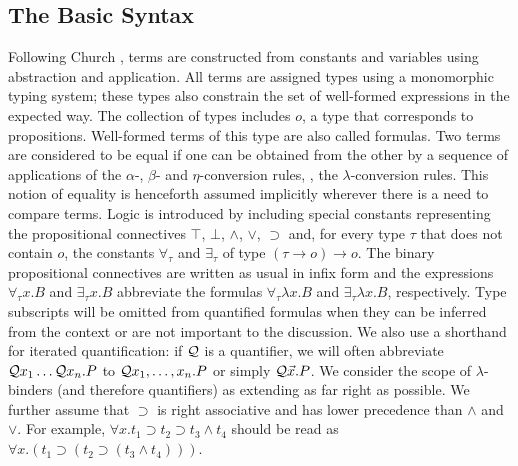 \subsection{The Basic Syntax}

Following Church \cite{church40}, terms are constructed from constants
and variables using abstraction and application. All terms are
assigned types using a monomorphic typing system; these types also
constrain the set of well-formed expressions in the expected way. The
collection of types includes $o$, a type that corresponds to
propositions. Well-formed terms of this type are also called formulas.
Two terms are considered to be equal if one can be obtained from the
other by a sequence of applications of the $\alpha$-, $\beta$- and
$\eta$-conversion rules, \ie, the $\lambda$-conversion rules. This
notion of equality is henceforth assumed implicitly wherever there is
a need to compare terms. Logic is introduced by including special
constants representing the propositional connectives $\top$, $\bot$,
$\land$, $\lor$, $\supset$ and, for every type $\tau$ that does not
contain $o$, the constants $\forall_\tau$ and $\exists_\tau$ of type
$(\tau \rightarrow o) \rightarrow o$. The binary propositional
connectives are written as usual in infix form and the expressions
$\forall_\tau x. B$ and $\exists_\tau x. B$ abbreviate the formulas
$\forall_\tau \lambda x.B$ and $\exists_\tau \lambda x.B$,
respectively. Type subscripts will be omitted from quantified formulas
when they can be inferred from the context or are not important to the
discussion. We also use a shorthand for iterated quantification: if
${\cal Q}$ is a quantifier, we will often abbreviate ${\cal
  Q}x_1\ldots{\cal Q}x_n.P$ to ${\cal Q}x_1,\ldots,x_n.P$ or simply
${\cal Q}\vec{x}.P$. We consider the scope of $\lambda$-binders (and
therefore quantifiers) as extending as far right as possible. We
further assume that $\supset$ is right associative and has lower
precedence than $\land$ and $\lor$. For example, $\forall x. t_1
\supset t_2 \supset t_3 \land t_4$ should be read as $\forall x.(t_1
\supset (t_2 \supset (t_3\land t_4)))$.

